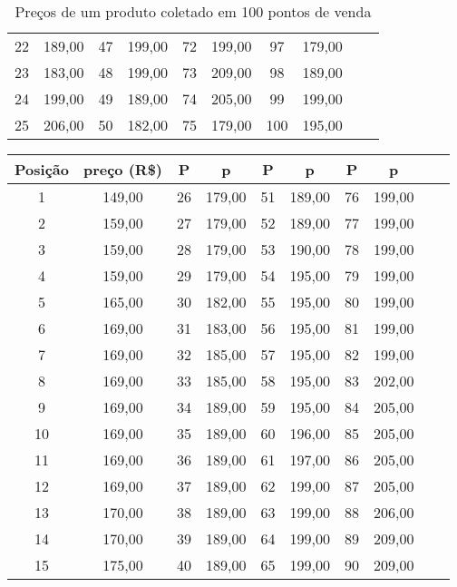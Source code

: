 \begin{table}
\begin{tabular}{cccccccccc}
    22         & 189,00      & 47 & 199,00 & 72 & 199,00 & 97  & 179,00 \\
    23         & 183,00      & 48 & 199,00 & 73 & 209,00 & 98  & 189,00 \\
    24         & 199,00      & 49 & 189,00 & 74 & 205,00 & 99  & 199,00 \\
    25         & 206,00      & 50 & 182,00 & 75 & 179,00 & 100 & 195,00 \\
    \bottomrule
    \end{tabular}
    \caption{Preços de um produto coletado em 100 pontos de venda}
    \label{tab:medidas-posicao}
\end{table}

\begin{table}
    \centering
    \begin{tabular}{cccccccccc}
    \toprule
    Posição  & preço (R\$) & P  & p      & P  & p      & P   & p \\
    \midrule
    1        & 149,00      & 26 & 179,00 & 51 & 189,00 & 76  & 199,00 \\
    2        & 159,00      & 27 & 179,00 & 52 & 189,00 & 77  & 199,00 \\
    3        & 159,00      & 28 & 179,00 & 53 & 190,00 & 78  & 199,00 \\
    4        & 159,00      & 29 & 179,00 & 54 & 195,00 & 79  & 199,00 \\
    5        & 165,00      & 30 & 182,00 & 55 & 195,00 & 80  & 199,00 \\
    6        & 169,00      & 31 & 183,00 & 56 & 195,00 & 81  & 199,00 \\
    7        & 169,00      & 32 & 185,00 & 57 & 195,00 & 82  & 199,00 \\
    8        & 169,00      & 33 & 185,00 & 58 & 195,00 & 83  & 202,00 \\
    9        & 169,00      & 34 & 189,00 & 59 & 195,00 & 84  & 205,00 \\
    10       & 169,00      & 35 & 189,00 & 60 & 196,00 & 85  & 205,00 \\
    11       & 169,00      & 36 & 189,00 & 61 & 197,00 & 86  & 205,00 \\
    12       & 169,00      & 37 & 189,00 & 62 & 199,00 & 87  & 205,00 \\
    13       & 170,00      & 38 & 189,00 & 63 & 199,00 & 88  & 206,00 \\
    14       & 170,00      & 39 & 189,00 & 64 & 199,00 & 89  & 209,00 \\
    15       & 175,00      & 40 & 189,00 & 65 & 199,00 & 90  & 209,00 \\

\end{tabular}
\end{table}
